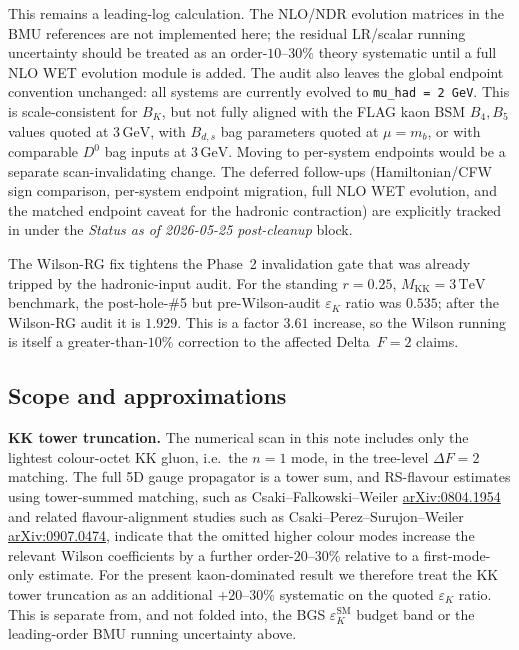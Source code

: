 \documentclass[11pt]{article}
\newcommand{\Mkk}{M_{\mathrm{KK}}}
\newcommand{\eK}{\varepsilon_K}
\begin{document}
This remains a leading-log calculation.  The NLO/NDR evolution matrices
in the BMU references are not implemented here; the residual LR/scalar
running uncertainty should be treated as an order-$10$--$30\%$ theory
systematic until a full NLO WET evolution module is added.  The audit
also leaves the global endpoint convention unchanged: all systems are
currently evolved to \texttt{mu\_had = 2 GeV}. This is scale-consistent
for $B_K$, but not fully aligned with the FLAG kaon BSM $B_4,B_5$
values quoted at $3\,\mathrm{GeV}$, with $B_{d,s}$ bag parameters
quoted at $\mu=m_b$, or with comparable $D^0$ bag inputs at
$3\,\mathrm{GeV}$.  Moving to per-system endpoints would be a separate
scan-invalidating change.  The deferred follow-ups (Hamiltonian/CFW
sign comparison, per-system endpoint migration, full NLO WET evolution,
and the matched endpoint caveat for the hadronic contraction) are
explicitly tracked in
 under the
\textit{Status as of 2026-05-25 post-cleanup} block.

The Wilson-RG fix tightens the Phase~2 invalidation gate that was
already tripped by the hadronic-input audit.  For the standing
$r=0.25$, $\Mkk=3\,\mathrm{TeV}$ benchmark, the post-hole-\#5 but
pre-Wilson-audit $\eK$ ratio was $0.535$; after the Wilson-RG audit it
is $1.929$.  This is a factor $3.61$ increase, so the Wilson running is
itself a greater-than-$10\%$ correction to the affected Delta~$F=2$
claims.

\subsection{Scope and approximations}
\label{app:scope-and-approximations}

\textbf{KK tower truncation.}  The numerical scan in this note includes
only the lightest colour-octet KK gluon, i.e.\ the $n=1$ mode, in the
tree-level $\Delta F=2$ matching.  The full 5D gauge propagator is a tower
sum, and RS-flavour estimates using tower-summed matching, such as
Csaki--Falkowski--Weiler
\href{https://arxiv.org/abs/0804.1954}{arXiv:0804.1954} and related
flavour-alignment studies such as Csaki--Perez--Surujon--Weiler
\href{https://arxiv.org/abs/0907.0474}{arXiv:0907.0474}, indicate that
the omitted higher colour modes increase the relevant Wilson coefficients
by a further order-$20$--$30\%$ relative to a first-mode-only estimate.
For the present kaon-dominated result we therefore treat the KK tower
truncation as an additional $+20$--$30\%$ systematic on the quoted
$\eK$ ratio.  This is separate from, and not folded into, the BGS
$\eK^{\mathrm{SM}}$ budget band or the leading-order BMU running
uncertainty above.
\end{document}

